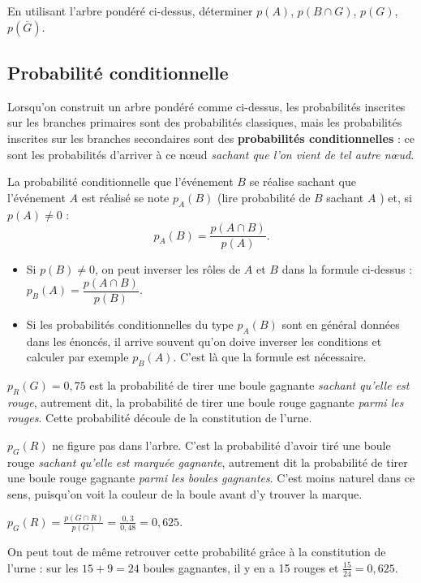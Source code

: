 \documentclass[a4paper,11pt]{article}
\begin{document}
\begin{cexercice}
En utilisant l'arbre pondéré ci-dessus, déterminer $p(A)$, $p(B \cap G)$, $p(G)$, $p(\overline{G})$.
\end{cexercice}

\subsection{Probabilité conditionnelle}

\begin{cdefi}
Lorsqu'on construit un arbre pondéré comme ci-dessus, les probabilités inscrites sur les branches primaires sont des probabilités classiques, mais les probabilités inscrites sur les branches secondaires sont des \textbf{probabilités conditionnelles} : ce sont les probabilités d'arriver à ce nœud \emph{sachant que l'on vient de tel autre nœud}.

La probabilité conditionnelle que l'événement $B$ se réalise sachant que l'événement $A$ est réalisé  se note $p_A(B)$ (lire \og probabilité de $B$ sachant $A$ \fg) et, si $p(A) \neq 0$ :\[p_A(B)=\dfrac{p(A \cap B)}{p(A)}.\]
\end{cdefi}

\begin{crmq}[s]
\vspace{-0.2cm}
\begin{itemize}[leftmargin=*]
	\item Si $p(B) \neq 0$, on peut inverser les rôles de $A$ et $B$ dans la formule ci-dessus : $ p_B(A)=\dfrac{p(A \cap B)}{p(B)}$.
	\item Si les probabilités conditionnelles du type $p_A(B)$ sont en général données dans les énoncés, il arrive souvent qu'on doive inverser les conditions et calculer par exemple $p_B(A)$. C'est là que la formule est nécessaire.
\end{itemize}
\end{crmq}

\begin{cexemple}
$p_{R}(G)=0,75$ est la probabilité de tirer une boule gagnante \textit{sachant qu'elle est rouge}, autrement dit, la probabilité de tirer une boule rouge gagnante \textit{parmi les rouges}. Cette probabilité découle de la constitution de l'urne.

\smallskip

$p_{G}(R)$ ne figure pas dans l'arbre. C'est la probabilité d'avoir tiré une boule rouge \textit{sachant qu'elle est marquée gagnante}, autrement dit la probabilité de tirer une boule rouge gagnante \textit{parmi les boules gagnantes}. C'est moins naturel dans ce sens, puisqu'on voit la couleur de la boule avant d'y trouver la marque.

\hfill$p_{G}(R)=\frac{p(G \cap R)}{p(G)}=\frac{0,3}{0,48}=0,625$.\hfill~

On peut tout de même retrouver cette probabilité grâce à la constitution de l'urne : sur les $15+9=24$ boules gagnantes, il y en a 15 rouges et $\frac{15}{24}=0,625$.
\end{cexemple}
\end{document}
